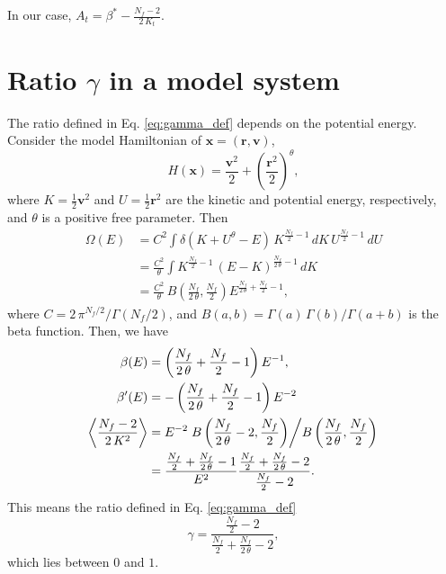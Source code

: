 \documentclass[preprint]{revtex4-1}
\begin{document}
In our case,
$
A_t = \beta^* - \frac{ N_f - 2 } { 2 \, K_t }.
$



\section{\label{sec:model}Ratio $\gamma$ in a model system}



The ratio defined in Eq. \eqref{eq:gamma_def}
depends on the potential energy.
%
Consider the model Hamiltonian of $\mathbf x = (\mathbf r, \mathbf v)$,
\begin{equation}
  H(\mathbf x)
  =
  \frac{\mathbf v^2} { 2 }
  +
  \left( \frac{\mathbf r^2} { 2 } \right)^\theta
  ,
\end{equation}
%
where $K = \frac 1 2 {\mathbf v}^2$ and
$U = \frac 1 2 {\mathbf r}^2$
are the kinetic and potential energy, respectively,
and $\theta$ is a positive free parameter.
Then
\begin{align*}
  \Omega(E)
  &=
  C^2
  \int
    \delta\left( K + U^\theta - E \right) \,
    K^{\frac{ N_f } 2 - 1} \, dK \, U^{\frac{ N_f } 2 - 1} \, dU
  \\
  &=
  \frac{ C^2 } { \theta }
  \int
  K^{\frac{ N_f } 2 - 1} \, (E - K)^{\frac{ N_f }{ 2 \, \theta } - 1}
    \, dK
  \\
  &=
  \frac{ C^2 }{ \theta } \,
  B\left( \frac{ N_f } {2 \, \theta}, \frac{ N_f } 2 \right)
  E^{ \frac{ N_f }{2 \, \theta} + \frac{N_f}{2} - 1 }
  ,
\end{align*}
where
%
$C = 2 \, \pi^{N_f/2} / \Gamma\left( N_f / 2 \right)$,
and
$B(a, b) = \Gamma(a) \, \Gamma(b) / \Gamma(a+b)$
is the beta function.
%
Then, we have
\begin{align*}
\beta(E)
&=
\left(
  \frac{ N_f } { 2 \, \theta } + \frac{ N_f } 2 - 1
\right)
E^{-1}
,
\\
\beta'(E)
&=
-
\left(
  \frac{ N_f } { 2 \, \theta } + \frac{ N_f } 2 - 1
\right)
E^{-2}
\\
\left\langle
  \frac{
    N_f - 2
  }
  {
    2 \, K^2
  }
\right\rangle
&=
  E^{-2}
\left.
  B\left( \frac{ N_f } { 2  \, \theta } - 2, \frac{ N_f } { 2 } \right)
\middle/
  B\left( \frac{ N_f } { 2  \, \theta }, \frac{ N_f } { 2 } \right)
\right.
\\
&=
\frac{ \frac{ N_f } 2 + \frac{ N_f }{2 \, \theta} - 1 }
     { E^2 }
\frac{ \frac{ N_f } 2 + \frac{ N_f }{2 \, \theta} - 2 }
     { \frac{ N_f } 2 - 2 }
.
\end{align*}
This means the ratio defined in Eq. \eqref{eq:gamma_def}
$$
\gamma
=
\frac
{
  \frac{ N_f } 2 - 2
}
{
  \frac{ N_f } 2 + \frac{N_f}{2 \, \theta} - 2
}
,
$$
which lies between $0$ and $1$.



%

\end{document}
